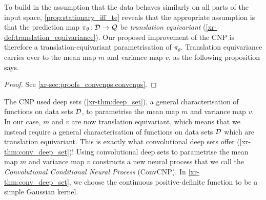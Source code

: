 \documentclass[12pt]{report}
\newcommand{\xrprefix}[1]{xr-#1}
\begin{document}
To build in the assumption that the data behaves similarly on all parts of the input space, \cref{prop:stationary_iff_te} reveals that the appropriate assumption is that the prediction map $\pi_\theta \colon \mathcal{D} \to \mathcal{Q}$ be \emph{translation equivariant} (\cref{\xrprefix{def:translation_equivariance}}).
Our proposed improvement of the CNP is therefore a translation-equivariant parametrisation of $\pi_\theta$.
Translation equivariance carries over to the mean map $m$ and variance map $v$, as the following proposition says.

\begin{proof}
    See \cref{\xrprefix{sec:proofs_convcnps:convcnps}}.   
\end{proof}


The CNP used deep sets (\cref{\xrprefix{thm:deep_set}}), a general characterisation of functions on data sets $\mathcal{D}$, to parametrise the mean map $m$ and variance map $v$.
In our case, $m$ and $v$ are now translation equivariant, which means that we instead require a general characterisation of functions on data sets $\mathcal{D}$ which are translation equivariant. 
This is exactly what convolutional deep sets offer (\cref{\xrprefix{thm:conv_deep_set}})!
Using convolutional deep sets to parametrise the mean map $m$ and variance map $v$ constructs a new neural process that we call the \emph{Convolutional Conditional Neural Process} (ConvCNP).
In \cref{\xrprefix{thm:conv_deep_set}}, we choose the continuous positive-definite function to be a simple Gaussian kernel.
\end{document}
